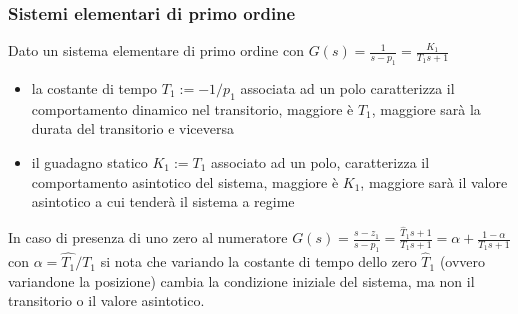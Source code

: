 \subsubsection*{Sistemi elementari di primo ordine}
Dato un sistema elementare di primo ordine con \(\displaystyle G(s) = \frac{1}{s-p_1} = \frac{K_1}{T_1s + 1}\)
\begin{itemize}
	\item la costante di tempo \(T_1 := -1/p_1\) associata ad un polo caratterizza il comportamento dinamico nel transitorio,
	maggiore è \(T_1\), maggiore sarà la durata del transitorio e viceversa
	\item il guadagno statico \(K_1 := T_1\) associato ad un polo, caratterizza il comportamento asintotico del sistema, maggiore
	è \(K_1\), maggiore sarà il valore asintotico a cui tenderà il sistema a regime
\end{itemize}
In caso di presenza di uno zero al numeratore \(\displaystyle G(s) = \frac{s-z_1}{s-p_1} = \frac{\hat{T}_1s + 1}{T_1s + 1} = \alpha + \frac{1-\alpha}{T_1s+1}\)
con \(\alpha = \hat{T_1}/T_1\) si nota che variando la costante di tempo dello zero \(\hat{T}_1\) (ovvero variandone la posizione)
cambia la condizione iniziale del sistema, ma non il transitorio o il valore asintotico.

